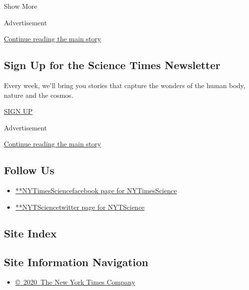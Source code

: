 Show More

Advertisement

\protect\hyperlink{after-mid3}{Continue reading the main story}

\hypertarget{sign-up-for-the-science-times-newsletter}{%
\subsection{Sign Up for the Science Times
Newsletter}\label{sign-up-for-the-science-times-newsletter}}

Every week, we'll bring you stories that capture the wonders of the
human body, nature and the cosmos.

\href{/newsletters/signup/SC}{SIGN UP}

Advertisement

\protect\hyperlink{after-mktg}{Continue reading the main story}

\hypertarget{follow-us}{%
\subsection{Follow Us}\label{follow-us}}

\begin{itemize}
\tightlist
\item
  \href{https://www.facebookcorewwwi.onion/NYTimesScience}{**NYTimesSciencefacebook
  page for NYTimesScience}
\item
  \href{https://twitter.com/NYTScience}{**NYTSciencetwitter page for
  NYTScience}
\end{itemize}

\hypertarget{site-index}{%
\subsection{Site Index}\label{site-index}}

\hypertarget{site-information-navigation}{%
\subsection{Site Information
Navigation}\label{site-information-navigation}}

\begin{itemize}
\tightlist
\item
  \href{https://help.nytimes3xbfgragh.onion/hc/en-us/articles/115014792127-Copyright-notice}{©~2020~The
  New York Times Company}
\end{itemize}

